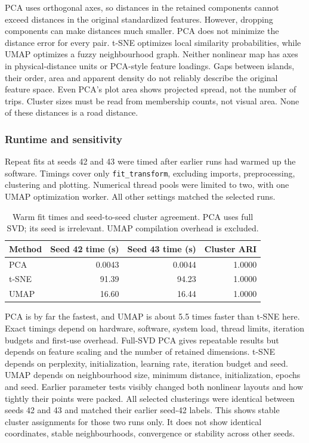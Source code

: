 \documentclass{article}
\begin{document}
PCA uses orthogonal axes, so distances in the retained components cannot
exceed distances in the original standardized features. However, dropping
components can make distances much smaller. PCA does not minimize the
distance error for every pair. t-SNE optimizes local similarity probabilities,
while UMAP optimizes a fuzzy neighbourhood graph. Neither nonlinear map has
axes in physical-distance units or PCA-style feature loadings.
Gaps between islands, their order, area and apparent density do not reliably
describe the original feature space. Even PCA's plot area shows projected
spread, not the number of trips. Cluster sizes must be read from membership
counts, not visual area. None of these distances is a road distance.

\subsubsection{Runtime and sensitivity}

Repeat fits at seeds 42 and 43 were timed after earlier runs had warmed up
the software. Timings cover only
\texttt{fit\_transform}, excluding imports, preprocessing, clustering and
plotting. Numerical thread pools were limited to two, with one UMAP
optimization worker. All other settings matched the selected runs.

\begin{table}[H]
  \caption{Warm fit times and seed-to-seed cluster agreement. PCA uses full
  SVD; its seed is irrelevant. UMAP compilation overhead is excluded.}
  \centering
  \begin{tabular}{lrrr}
    \toprule
    Method & Seed 42 time (s) & Seed 43 time (s) & Cluster ARI \\
    \midrule
    PCA & 0.0043 & 0.0044 & 1.0000 \\
    t-SNE & 91.39 & 94.23 & 1.0000 \\
    UMAP & 16.60 & 16.44 & 1.0000 \\
    \bottomrule
  \end{tabular}
\end{table}

PCA is by far the fastest, and UMAP is about 5.5 times faster than t-SNE here.
Exact timings depend on hardware, software, system load, thread limits,
iteration budgets and first-use overhead. Full-SVD PCA gives repeatable
results but depends on feature scaling and the number of retained dimensions.
t-SNE depends on perplexity,
initialization, learning rate, iteration budget and seed. UMAP depends on
neighbourhood size, minimum distance, initialization, epochs and seed.
Earlier parameter tests visibly changed both nonlinear layouts and how
tightly their points were packed. All selected clusterings were identical
between seeds 42 and 43 and matched their earlier seed-42 labels.
This shows stable cluster assignments for those two runs only. It does not
show identical coordinates, stable neighbourhoods, convergence or stability
across other seeds.
\end{document}
